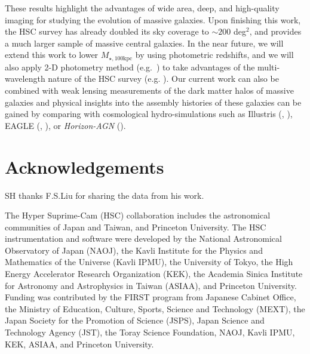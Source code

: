 \documentclass[a4paper,fleqn,usenatbib]{mnras}
\def\mtot{{$M_{\star,100\mathrm{kpc}}$}}
\begin{document}
    These results highlight the advantages of wide area, deep, and high-quality imaging 
    for studying the evolution of massive galaxies. 
    Upon finishing this work, the HSC survey has already doubled its sky coverage to 
    ${\sim} 200$ deg$^2$, and provides a much larger sample of massive central galaxies. 
    In the near future, we will extend this work to lower \mtot{} by using photometric 
    redshifts, and we will also apply 2-D photometry method (e.g.\ \citealt{Huang2013a}) 
    to take advantages of the multi-wavelength nature of the HSC survey 
    (e.g. \citealt{Huang2016}). 
    Our current work can also be combined with weak lensing measurements of the dark 
    matter halos of massive galaxies and physical insights into the assembly histories 
    of these galaxies can be gained by comparing with cosmological hydro-simulations 
    such as Illustris (\citealt{Vogelsberger2014}, \citealt{Genel2014}), 
    EAGLE (\citealt{Schaye2015}, \citealt{Crain2015}), or \textit{Horizon-AGN} 
    (\citealt{Dubois2014}).

  
\section*{Acknowledgements}

  SH thanks F.S.Liu for sharing the data from his work.

  The Hyper Suprime-Cam (HSC) collaboration includes the astronomical communities of 
  Japan and Taiwan, and Princeton University.  The HSC instrumentation and software were
  developed by the National Astronomical Observatory of Japan (NAOJ), the Kavli Institute
  for the Physics and Mathematics of the Universe (Kavli IPMU), the University of Tokyo,
  the High Energy Accelerator Research Organization (KEK), the Academia Sinica Institute
  for Astronomy and Astrophysics in Taiwan (ASIAA), and Princeton University.  
  Funding was contributed by the FIRST program from Japanese Cabinet Office, the Ministry 
  of Education, Culture, Sports, Science and Technology (MEXT), the Japan Society for 
  the Promotion of Science (JSPS), Japan Science and Technology Agency (JST), the
  Toray Science Foundation, NAOJ, Kavli IPMU, KEK, ASIAA, and Princeton University.
   
\end{document}
